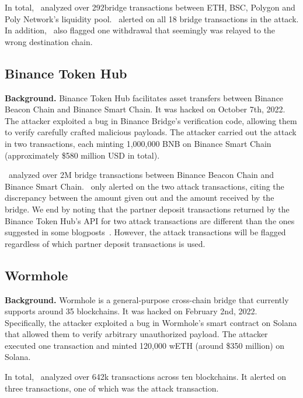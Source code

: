  In total, \offlinetool~analyzed over 292\thou bridge transactions between ETH, BSC, Polygon and Poly Network's liquidity pool. \offlinetool~alerted on all 18 bridge transactions in the attack. In addition, \offlinetool~also flagged one withdrawal that seemingly was relayed to the wrong destination chain.

\subsection{Binance Token Hub}
\textbf{Background.} Binance Token Hub
facilitates asset transfers between Binance Beacon Chain and Binance Smart Chain. It was hacked on
October 7th, 2022. The attacker exploited a bug in Binance Bridge's verification code, allowing them to verify carefully crafted malicious payloads. The attacker carried out the attack in two transactions, each minting 1,000,000 BNB on Binance Smart Chain (approximately \$580 million USD in total).

 \offlinetool~analyzed over 2M bridge transactions between 
Binance Beacon Chain and Binance Smart Chain. 
\offlinetool~only alerted on the two attack transactions, citing the discrepancy between the amount given out and the amount received by the bridge. We end by noting that the partner deposit transactions returned by the Binance Token Hub's API for two attack transactions are different than the ones suggested in some blogposts~\cite{binanceproof:online}. However, the attack transactions will be flagged regardless of which partner deposit transactions is used.


\subsection{Wormhole}
\textbf{Background.} 
Wormhole is a general-purpose cross-chain bridge that 
currently supports around 35 blockchains. It was hacked on February 2nd, 2022. Specifically, the attacker exploited a bug in Wormhole's smart contract on Solana that allowed them to verify arbitrary unauthorized payload. The attacker executed one transaction and minted 120,000 wETH (around \$350 million) on Solana.


In total, \offlinetool~analyzed over 642k transactions across ten blockchains. It alerted on three transactions, one of which was the attack transaction. 


